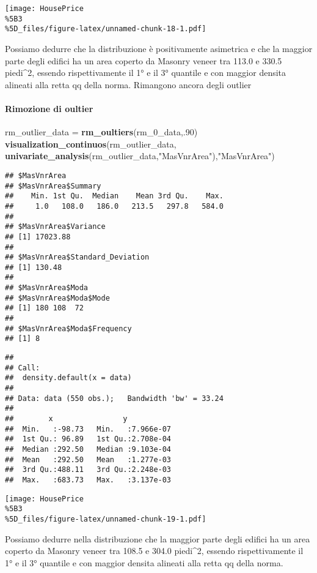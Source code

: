 \documentclass[
]{article}
\newenvironment{Shaded}{\begin{snugshade}}{\end{snugshade}}
\newcommand{\DecValTok}[1]{\textcolor[rgb]{0.00,0.00,0.81}{#1}}
\newcommand{\FunctionTok}[1]{\textcolor[rgb]{0.13,0.29,0.53}{\textbf{#1}}}
\newcommand{\NormalTok}[1]{#1}
\newcommand{\OtherTok}[1]{\textcolor[rgb]{0.56,0.35,0.01}{#1}}
\newcommand{\StringTok}[1]{\textcolor[rgb]{0.31,0.60,0.02}{#1}}
\begin{document}
\texttt{[image: HousePrice\\\%5B3\\\%5D\_files/figure-latex/unnamed-chunk-18-1.pdf]}

Possiamo dedurre che la distribuzione è positivamente asimetrica e che
la maggior parte degli edifici ha un area coperto da Masonry veneer tra
113.0 e 330.5 piedi\^{}2, essendo rispettivamente il 1° e il 3° quantile
e con maggior densita alineati alla retta qq della norma. Rimangono
ancora degli outlier

\paragraph{Rimozione di oultier}\label{rimozione-di-oultier}

\begin{Shaded}
\begin{Highlighting}[]
\NormalTok{rm\_outlier\_data }\OtherTok{=} \FunctionTok{rm\_oultiers}\NormalTok{(rm\_0\_data,.}\DecValTok{90}\NormalTok{)}
\FunctionTok{visualization\_continuos}\NormalTok{(rm\_outlier\_data, }\FunctionTok{univariate\_analysis}\NormalTok{(rm\_outlier\_data,}\StringTok{"MasVnrArea"}\NormalTok{),}\StringTok{"MasVnrArea"}\NormalTok{)}
\end{Highlighting}
\end{Shaded}

\begin{verbatim}
## $MasVnrArea
## $MasVnrArea$Summary
##    Min. 1st Qu.  Median    Mean 3rd Qu.    Max. 
##     1.0   108.0   186.0   213.5   297.8   584.0 
## 
## $MasVnrArea$Variance
## [1] 17023.88
## 
## $MasVnrArea$Standard_Deviation
## [1] 130.48
## 
## $MasVnrArea$Moda
## $MasVnrArea$Moda$Mode
## [1] 180 108  72
## 
## $MasVnrArea$Moda$Frequency
## [1] 8
\end{verbatim}

\begin{verbatim}
## 
## Call:
##  density.default(x = data)
## 
## Data: data (550 obs.);   Bandwidth 'bw' = 33.24
## 
##        x                y            
##  Min.   :-98.73   Min.   :7.966e-07  
##  1st Qu.: 96.89   1st Qu.:2.708e-04  
##  Median :292.50   Median :9.103e-04  
##  Mean   :292.50   Mean   :1.277e-03  
##  3rd Qu.:488.11   3rd Qu.:2.248e-03  
##  Max.   :683.73   Max.   :3.137e-03
\end{verbatim}

\texttt{[image: HousePrice\\\%5B3\\\%5D\_files/figure-latex/unnamed-chunk-19-1.pdf]}

Possiamo dedurre nella distribuzione che la maggior parte degli edifici
ha un area coperto da Masonry veneer tra 108.5 e 304.0 piedi\^{}2,
essendo rispettivamente il 1° e il 3° quantile e con maggior densita
alineati alla retta qq della norma.
\end{document}
